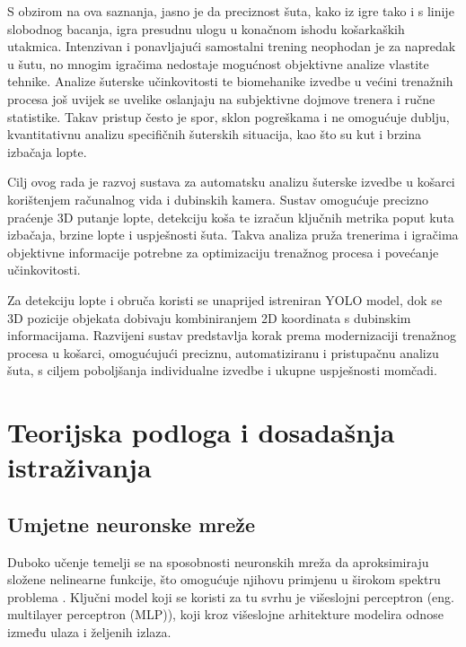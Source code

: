 \documentclass[zavrsnirad]{fer}
\begin{document}
S obzirom na ova saznanja, jasno je da preciznost šuta, kako iz igre tako i s linije slobodnog bacanja, igra presudnu ulogu u konačnom ishodu košarkaških utakmica. 
Intenzivan i ponavljajući samostalni trening neophodan je za napredak u šutu, no mnogim igračima nedostaje mogućnost objektivne analize vlastite tehnike.
Analize šuterske učinkovitosti te biomehanike izvedbe u većini trenažnih procesa još uvijek se uvelike oslanjaju na subjektivne dojmove trenera i ručne statistike.  
Takav pristup često je spor, sklon pogreškama i ne omogućuje dublju, kvantitativnu analizu specifičnih šuterskih situacija, kao što su kut i brzina izbačaja lopte.

Cilj ovog rada je razvoj sustava za automatsku analizu šuterske izvedbe u košarci korištenjem računalnog vida i dubinskih kamera. 
Sustav omogućuje precizno praćenje 3D putanje lopte, detekciju koša te izračun ključnih metrika poput kuta izbačaja, brzine lopte i uspješnosti šuta. 
Takva analiza pruža trenerima i igračima objektivne informacije potrebne za optimizaciju trenažnog procesa i povećanje učinkovitosti.

Za detekciju lopte i obruča koristi se unaprijed istreniran YOLO model, dok se 3D pozicije objekata dobivaju kombiniranjem 2D koordinata s dubinskim informacijama. 
Razvijeni sustav predstavlja korak prema modernizaciji trenažnog procesa u košarci, omogućujući preciznu, automatiziranu i pristupačnu analizu šuta, s ciljem poboljšanja individualne izvedbe i ukupne uspješnosti momčadi.

\chapter{Teorijska podloga i dosadašnja istraživanja}
\label{pog:teorijska_podloga_i_dosadasnja_istrazivanja}

\section{Umjetne neuronske mreže}
\label{pog:kosarkaska_tehnika_suta}
Duboko učenje temelji se na sposobnosti neuronskih mreža da aproksimiraju složene nelinearne funkcije, što omogućuje njihovu primjenu u širokom spektru problema \cite{Goodfellow-et-al-2016}. 
Ključni model koji se koristi za tu svrhu je višeslojni perceptron (eng. multilayer perceptron (MLP)), koji kroz višeslojne arhitekture modelira odnose između ulaza i željenih izlaza.
\end{document}
